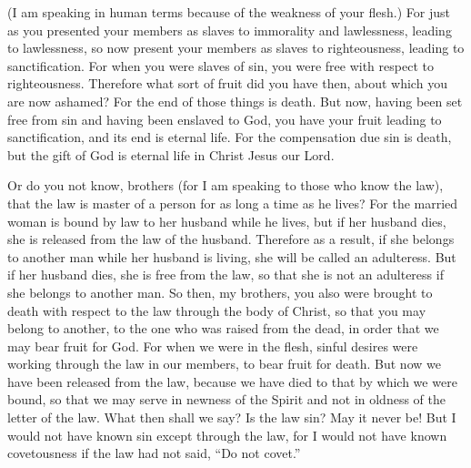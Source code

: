 \begin{biblechapter}
\verse (I am speaking in human terms because of the weakness of your flesh.) For just as you presented your members as slaves to immorality and lawlessness, leading to lawlessness, so now present your members as slaves to righteousness, leading to sanctification.
\verse For when you were slaves of sin, you were free with respect to righteousness.
\verse Therefore what sort of fruit did you have then, about which you are now ashamed? For the end of those things is death.
\verse But now, having been set free from sin and having been enslaved to God, you have your fruit leading to sanctification, and its end is eternal life.
\verse For the compensation due sin is death, but the gift of God is eternal life in Christ Jesus our Lord.
\end{biblechapter}

\begin{biblechapter} %
 Or do you not know, brothers (for I am speaking to those who know the law), that the law is master of a person for as long a time as he lives?
\verse For the married woman is bound by law to her husband while he lives, but if her husband dies, she is released from the law of the husband.
\verse Therefore as a result, if she belongs to another man while her husband is living, she will be called an adulteress. But if her husband dies, she is free from the law, so that she is not an adulteress if she belongs to another man.
\verse So then, my brothers, you also were brought to death with respect to the law through the body of Christ, so that you may belong to another, to the one who was raised from the dead, in order that we may bear fruit for God.
\verse For when we were in the flesh, sinful desires were working through the law in our members, to bear fruit for death.
\verse But now we have been released from the law, because we have died to that by which we were bound, so that we may serve in newness of the Spirit and not in oldness of the letter of the law.
 What then shall we say? Is the law sin? May it never be! But I would not have known sin except through the law, for I would not have known covetousness if the law had not said, “Do not covet.”

\end{biblechapter}
